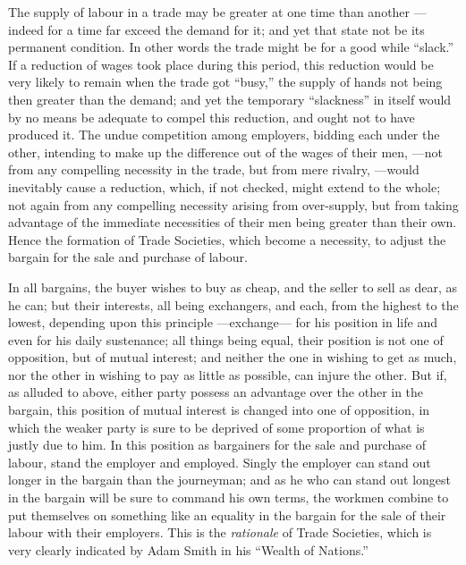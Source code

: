 The supply of labour in a trade may be greater at one time than another
--- indeed for a time far exceed the demand for it; and yet that state
not be its permanent condition. In other words the trade might be for a
good while ``slack.'' If a reduction of wages took place during this
period, this reduction would be very likely to remain when the trade got
``busy,'' the supply of hands not being then greater than the demand;
and yet the temporary ``slackness'' in itself would by no means be
adequate to compel this reduction, and ought not to have produced it.
The undue competition among employers, bidding each under the other,
intending to make up the difference out of the wages of their men,
---not from any compelling necessity in the trade, but from mere
rivalry, ---would inevitably cause a reduction, which, if not checked,
might extend to the whole; not again from any compelling necessity
arising from over-supply, but from taking advantage of the immediate
necessities of their men being greater than their own. Hence the
formation of Trade Societies, which become a necessity, to adjust the
bargain for the sale and purchase of labour.

In all bargains, the buyer wishes to buy as cheap, and the seller to
sell as dear, as he can; but their interests, all being exchangers, and
each, from the highest to the lowest, depending upon this principle
---exchange--- for his position in life and even for his daily
sustenance; all things being equal, their position is not one of
opposition, but of mutual interest; and neither the one in wishing to
get as much, nor the other in wishing to pay as little as possible, can
injure the other. But if, as alluded to above, either party possess an
advantage over the other in the bargain, this position of mutual
interest is changed into one of opposition, in which the weaker party is
sure to be deprived of some proportion of what is justly due to him. In
this position as bargainers for the sale and purchase of labour, stand
the employer and employed. Singly the employer can stand out longer in
the bargain than the journeyman; and as he who can stand out longest in
the bargain will be sure to command his own terms, the workmen combine
to put themselves on something like an equality in the bargain for the
sale of their labour with their employers. This is the
\textit{rationale} of Trade Societies, which is very clearly indicated
by Adam Smith in his ``Wealth of Nations.''